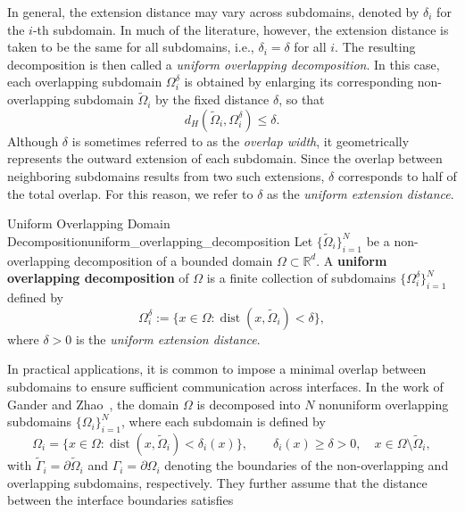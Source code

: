 \documentclass[a4paper, 11pt]{article}
\theoremstyle{remark}
\begin{document}
\noindent In general, the extension distance may vary across subdomains, denoted by $\delta_i$ for the $i$-th subdomain. In much of the literature, however, the extension distance is taken to be the same for all subdomains, i.e., $\delta_i = \delta$ for all $i$. The resulting decomposition is then called a \textit{uniform overlapping decomposition}. In this case, each overlapping subdomain $\Omega_i^{\delta}$ is obtained by enlarging its corresponding non-overlapping subdomain $\widetilde{\Omega}_i$ by the fixed distance $\delta$, so that
\begin{equation*}
    d_H(\widetilde{\Omega}_i, \Omega_i^{\delta}) \leq \delta.
\end{equation*}
Although $\delta$ is sometimes referred to as the \textit{overlap width}, it geometrically represents the outward extension of each subdomain. Since the overlap between neighboring subdomains results from two such extensions, $\delta$ corresponds to half of the total overlap. For this reason, we refer to $\delta$ as the \textit{uniform extension distance}.
\begin{definition}{Uniform Overlapping Domain Decomposition}{uniform_overlapping_decomposition}
Let $\{\widetilde{\Omega}_i\}_{i=1}^N$ be a non-overlapping decomposition of a bounded domain $\Omega \subset \mathbb{R}^d$. A \textbf{uniform overlapping decomposition} of $\Omega$ is a finite collection of subdomains $\{\Omega_i^{\delta}\}_{i=1}^N$ defined by
\begin{equation*}
    \Omega_i^{\delta} := \{ x \in \Omega : \operatorname{dist}(x, \widetilde{\Omega}_i) < \delta \},
\end{equation*}
where $\delta > 0$ is the \textit{uniform extension distance}.
\end{definition}
\noindent In practical applications, it is common to impose a minimal overlap between subdomains to ensure sufficient communication across interfaces. In the work of Gander and Zhao~\cite{GanderZhao2002}, the domain $\Omega$ is decomposed into $N$ nonuniform overlapping subdomains $\{\Omega_i\}_{i=1}^N$, where each subdomain is defined by
\begin{equation*}
    \Omega_i = \{ x \in \Omega : \operatorname{dist}(x, \widetilde{\Omega}_i) < \delta_i(x) \}, \qquad \delta_i(x) \geq \delta > 0, \quad x \in \Omega \setminus \widetilde{\Omega}_i,
\end{equation*}
with $\widetilde{\Gamma}_i = \partial \widetilde{\Omega}_i$ and $\Gamma_i = \partial \Omega_i$ denoting the boundaries of the non-overlapping and overlapping subdomains, respectively. They further assume that the distance between the interface boundaries satisfies
\end{document}

